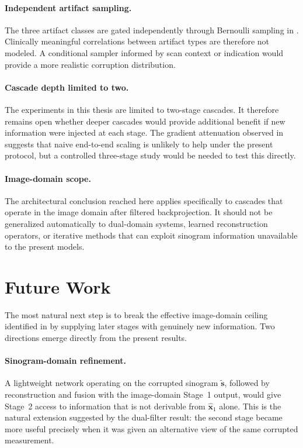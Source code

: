 \paragraph{Independent artifact sampling.}
The three artifact classes are gated independently through Bernoulli sampling in . Clinically meaningful correlations between artifact types are therefore not modeled. A conditional sampler informed by scan context or indication would provide a more realistic corruption distribution.

\paragraph{Cascade depth limited to two.}
The experiments in this thesis are limited to two-stage cascades. It therefore remains open whether deeper cascades would provide additional benefit if new information were injected at each stage. The gradient attenuation observed in  suggests that naive end-to-end scaling is unlikely to help under the present protocol, but a controlled three-stage study would be needed to test this directly.

\paragraph{Image-domain scope.}
The architectural conclusion reached here applies specifically to cascades that operate in the image domain after filtered backprojection. It should not be generalized automatically to dual-domain systems, learned reconstruction operators, or iterative methods that can exploit sinogram information unavailable to the present models.

\section{Future Work}
\label{sec:conc_future}

The most natural next step is to break the effective image-domain ceiling identified in  by supplying later stages with genuinely new information. Two directions emerge directly from the present results.

\paragraph{Sinogram-domain refinement.}
A lightweight network operating on the corrupted sinogram $\tilde{\mathbf{s}}$, followed by reconstruction and fusion with the image-domain Stage~1 output, would give Stage~2 access to information that is not derivable from $\hat{\mathbf{x}}_1$ alone. This is the natural extension suggested by the dual-filter result: the second stage became more useful precisely when it was given an alternative view of the same corrupted measurement.

